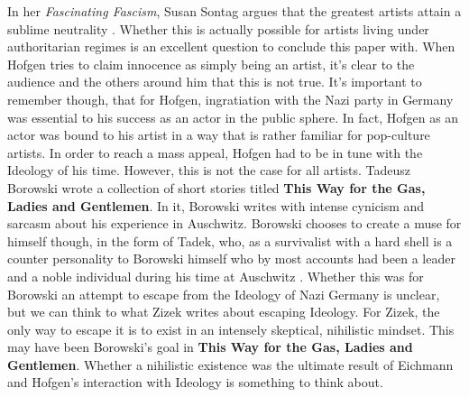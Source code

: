 \documentclass[a4paper, 11pt]{article} %
\begin{document}
In her \textit{Fascinating Fascism}, Susan Sontag argues that the greatest artists attain a sublime neutrality \cite{Sontag}.  Whether this is actually possible for artists living under authoritarian regimes is an excellent question to conclude this paper with.  When Hofgen tries to claim innocence as simply being an artist, it's clear to the audience and the others around him that this is not true.  It's important to remember though, that for Hofgen, ingratiation with the Nazi party in Germany was essential to his success as an actor in the public sphere.  In fact, Hofgen as an actor was bound to his artist in a way that is rather familiar for pop-culture artists.  In order to reach a mass appeal, Hofgen had to be in tune with the Ideology of his time.  However, this is not the case for all artists.  Tadeusz Borowski wrote a collection of short stories titled \textbf{This Way for the Gas, Ladies and Gentlemen}.  In it, Borowski writes with intense cynicism and sarcasm about his experience in Auschwitz.  Borowski chooses to create a muse for himself though, in the form of Tadek, who, as a survivalist with a hard shell is a counter personality to Borowski himself who by most accounts had been a leader and a noble individual during his time at Auschwitz \cite{Lecture3}.  Whether this was for Borowski an attempt to escape from the Ideology of Nazi Germany is unclear, but we can think to what Zizek writes about escaping Ideology.  For Zizek, the only way to escape it is to exist in an intensely skeptical, nihilistic mindset.  This may have been Borowski's goal in \textbf{This Way for the Gas, Ladies and Gentlemen}.  Whether a nihilistic existence was the ultimate result of Eichmann and Hofgen's interaction with Ideology is something to think about.  



\newpage


\end{document}
